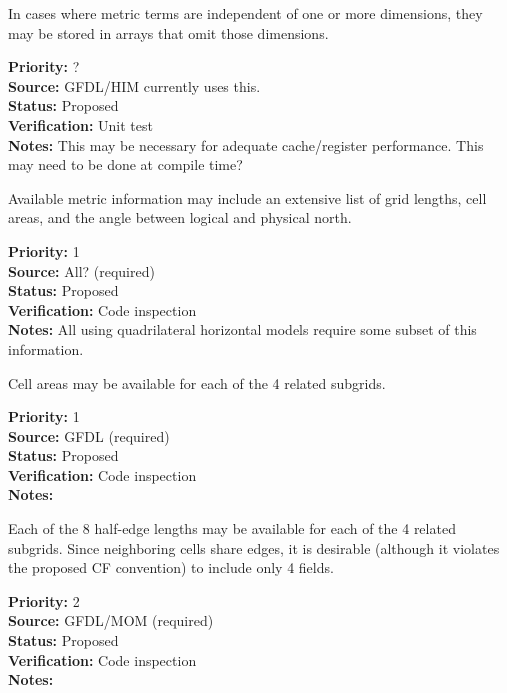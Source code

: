 In cases where metric terms are independent of one or more dimensions, they may be
stored in arrays that omit those dimensions.
\begin{reqlist}
{\bf Priority:} ? \\
{\bf Source:} GFDL/HIM currently uses this. \\
{\bf Status:} Proposed \\
{\bf Verification:} Unit test \\
{\bf Notes:} This may be necessary for adequate cache/register performance.  This may
need to be done at compile time?
\end{reqlist}

Available metric information may include an extensive list of grid lengths, cell
areas, and the angle between logical and physical north.
\begin{reqlist}
{\bf Priority:} 1 \\
{\bf Source:} All? (required) \\
{\bf Status:} Proposed \\
{\bf Verification:} Code inspection \\
{\bf Notes:} All using quadrilateral horizontal models require some subset of this information.
\end{reqlist}

Cell areas may be available for each of the 4 related subgrids.
\begin{reqlist}
{\bf Priority:} 1 \\
{\bf Source:} GFDL (required) \\
{\bf Status:} Proposed \\
{\bf Verification:} Code inspection \\
{\bf Notes:} 
\end{reqlist}

Each of the 8 half-edge lengths may be available for each of the 4 related
subgrids.  Since neighboring cells share edges, it is desirable (although it violates
the proposed CF convention) to include only 4 fields.
\begin{reqlist}
{\bf Priority:} 2 \\
{\bf Source:} GFDL/MOM (required) \\
{\bf Status:} Proposed \\
{\bf Verification:} Code inspection \\
{\bf Notes:} 
\end{reqlist}

